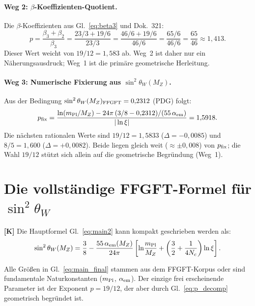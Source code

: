 \paragraph{Weg 2: $\beta$-Koeffizienten-Quotient.}

Die $\beta$-Koeffizienten aus Gl.~\eqref{eq:beta3} und
Dok.~321:
\begin{equation}
  p = \frac{\beta_3 + \beta_2}{\beta_3}
    = \frac{23/3 + 19/6}{23/3}
    = \frac{46/6 + 19/6}{46/6}
    = \frac{65/6}{46/6}
    = \frac{65}{46}
    \approx 1{,}413.
  \label{eq:p_weg2}
\end{equation}
Dieser Wert weicht von $19/12 = 1{,}583$ ab. Weg~2 ist daher nur
ein Näherungsausdruck; Weg~1 ist die primäre geometrische Herleitung.

\paragraph{Weg 3: Numerische Fixierung aus $\sin^2\theta_W(M_Z)$.}

Aus der Bedingung $\sin^2\theta_W(M_Z)_{\rm FFGFT} = 0{,}2312$
(PDG) folgt:
\begin{equation}
  p_{\rm fix}
  = \frac{\ln(m_{\rm Pl}/M_Z)
          - 24\pi\,(3/8-0{,}2312)/(55\,\alpha_{\rm em})}
         {|\ln\xi|}
  = 1{,}5918.
  \label{eq:p_fix}
\end{equation}
Die nächsten rationalen Werte sind $19/12 = 1{,}5833$ ($\Delta = -0{,}0085$)
und $8/5 = 1{,}600$ ($\Delta = +0{,}0082$). Beide liegen gleich weit
($\approx\pm0{,}008$) von $p_{\rm fix}$; die Wahl $19/12$ stützt sich
allein auf die geometrische Begründung (Weg~1).

\section{Die vollständige FFGFT-Formel für $\sin^2\theta_W$}

\textbf{[K]} Die Hauptformel Gl.~\eqref{eq:main2} kann kompakt
geschrieben werden als:
\begin{equation}
  \sin^2\theta_W(M_Z)
  = \frac{3}{8}
  - \frac{55\,\alpha_{\rm em}(M_Z)}{24\pi}
    \left[\ln\!\frac{m_{\rm Pl}}{M_Z}
         + \left(\frac{3}{2} + \frac{1}{4N_c}\right)\ln\xi\right].
  \label{eq:main_final}
\end{equation}

Alle Größen in Gl.~\eqref{eq:main_final} stammen aus dem FFGFT-Korpus
oder sind fundamentale Naturkonstanten ($m_{\rm Pl}$,
$\alpha_{\rm em}$). Der einzige frei erscheinende Parameter ist der
Exponent $p = 19/12$, der aber durch Gl.~\eqref{eq:p_decomp}
geometrisch begründet ist.

